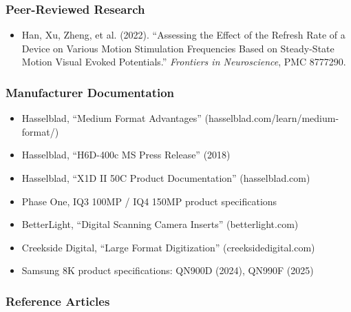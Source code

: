 \documentclass[11pt,letterpaper]{article}
\begin{document}
\subsubsection{Peer-Reviewed Research}

\begin{itemize}[leftmargin=*]
  \item Han, Xu, Zheng, et al. (2022). ``Assessing the Effect of the Refresh Rate of a Device on
        Various Motion Stimulation Frequencies Based on Steady-State Motion Visual Evoked Potentials.''
        \textit{Frontiers in Neuroscience}, PMC 8777290.
\end{itemize}

\subsubsection{Manufacturer Documentation}

\begin{itemize}[leftmargin=*]
  \item Hasselblad, ``Medium Format Advantages'' (hasselblad.com/learn/medium-format/)
  \item Hasselblad, ``H6D-400c MS Press Release'' (2018)
  \item Hasselblad, ``X1D II 50C Product Documentation'' (hasselblad.com)
  \item Phase One, IQ3 100MP / IQ4 150MP product specifications
  \item BetterLight, ``Digital Scanning Camera Inserts'' (betterlight.com)
  \item Creekside Digital, ``Large Format Digitization'' (creeksidedigital.com)
  \item Samsung 8K product specifications: QN900D (2024), QN990F (2025)
\end{itemize}

\subsubsection{Reference Articles}
\end{document}
